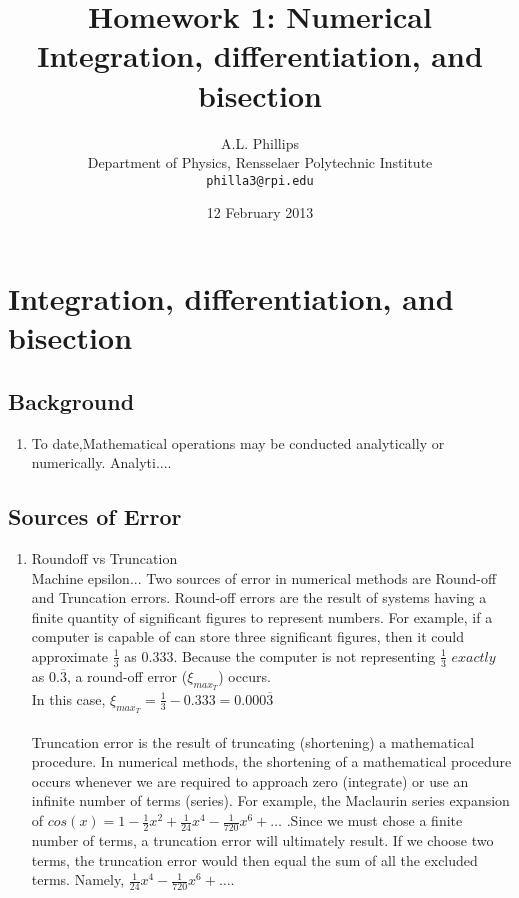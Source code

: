 \documentclass{report}
\begin{document}
\title{\textbf{Homework 1:} Numerical Integration, differentiation, and bisection}
\author{A.L. Phillips\\
  Department of Physics,%
  Rensselaer Polytechnic Institute\\
  \texttt{philla3@rpi.edu}}
\date{12 February 2013}
\maketitle
\chapter{Integration, differentiation, and bisection}

\section{Background}
\begin{enumerate}
\item To date,Mathematical operations may be conducted analytically or numerically. Analyti....  
\end{enumerate}

\section{Sources of Error}
\begin{enumerate}
\item Roundoff vs Truncation
\\Machine epsilon...
Two sources of error in numerical methods are Round-off and Truncation errors. Round-off errors are the result of systems having a finite quantity of significant figures to represent numbers. For example, if a computer is capable of can store three significant figures, then it could approximate $ \frac{1}{3}$ as $0.333$. Because the computer is not representing $ \frac{1}{3}$ $exactly$ as $0.\overline{3}$, a round-off error ($\xi_{max_{T}}$) occurs. 
\\In this case, $\displaystyle \xi_{max_{T}} = \frac{1}{3} - 0.333 = 0.000\overline{3} $
\\
\\Truncation error is the result of truncating (shortening) a mathematical procedure. In numerical methods, the shortening of a mathematical procedure occurs whenever we are required to approach zero (integrate) or use an infinite number of terms (series). For example, the Maclaurin series expansion of $cos(x) = 1 - \frac{1}{2}x^2 + \frac{1}{24}x^4 - \frac{1}{720}x^6 + \ldots$ .Since we must chose a finite number of terms, a truncation error will ultimately result. If we choose two terms, the truncation error would then equal the sum of all the excluded terms. Namely, $\frac{1}{24}x^4 - \frac{1}{720}x^6 + \ldots$.  

\end{enumerate}
\end{document}
